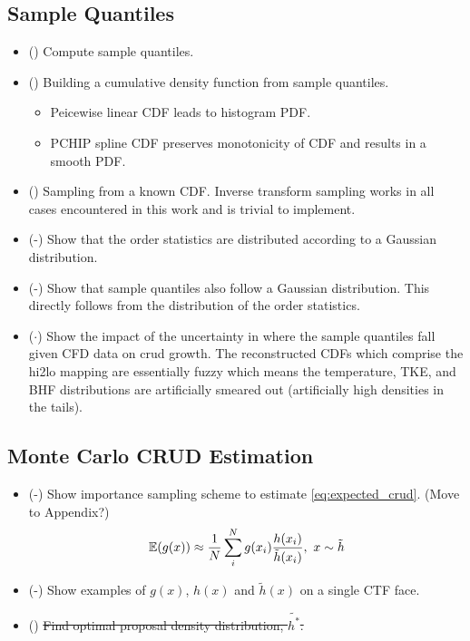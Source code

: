 \subsection{Sample Quantiles}

\begin{itemize}
	\item (\checkmark) Compute sample quantiles.
	\item (\checkmark) Building a cumulative density function from sample quantiles.  
	\begin{itemize}
	   \item Peicewise linear CDF leads to histogram PDF.
	   \item PCHIP spline CDF preserves monotonicity of CDF and results in a smooth PDF. \cite{Fritsch80}
	\end{itemize}
	\item (\checkmark) Sampling from a known CDF.  Inverse transform sampling works in all cases encountered in this work and is trivial to implement.
	\item (\checkmark-) Show that the order statistics are distributed according to a Gaussian distribution.  
	\item (\checkmark-) Show that  sample quantiles also follow a Gaussian distribution.  This directly follows from the distribution of the order statistics.
	\item ($\cdot$) Show the impact of the uncertainty in where the sample quantiles fall given CFD data on crud growth.  The reconstructed CDFs which comprise the hi2lo mapping are essentially fuzzy which means the temperature, TKE, and BHF distributions are artificially smeared out (artificially high densities in the tails).
\end{itemize}

\subsection{Monte Carlo CRUD Estimation}

\begin{itemize}
	\item (\checkmark-) Show importance sampling scheme to estimate \ref{eq:expected_crud}.  (Move to Appendix?)
	\begin{equation}
	\operatorname*{\mathbb{E}}(g(x)) \approx \frac{1}{N} \sum_i^N g(x_i) \frac{h(x_i)}{\tilde h(x_i)}, \ x \sim \tilde{h}
	\end{equation}
	\item (\checkmark-) Show examples of $g(x)$, $h(x)$ and $\tilde h(x)$ on a single CTF face.
	\item (\xmark) \sout{Find optimal proposal density distribution, $\tilde{h^*}$.}
\end{itemize}


